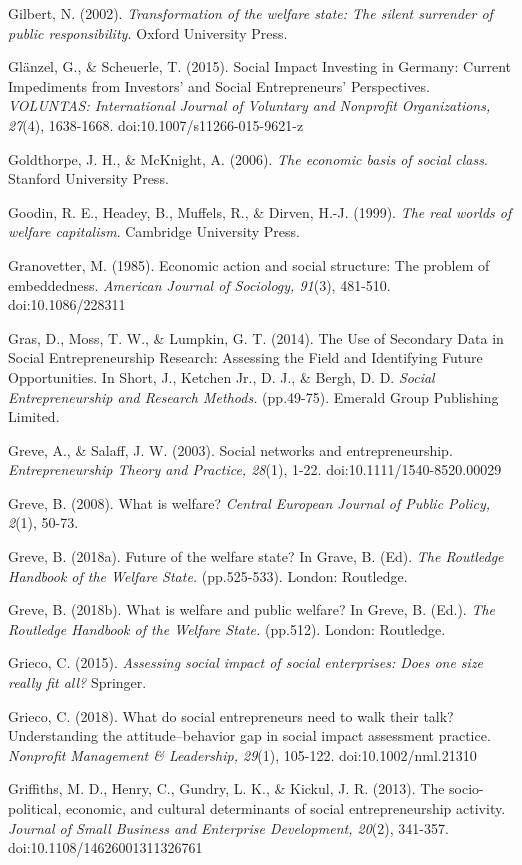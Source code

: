 \documentclass{article}
\begin{document}
Gilbert, N. (2002). \emph{Transformation of the welfare state: The silent surrender of public responsibility.} Oxford University Press.

Glänzel, G., \& Scheuerle, T. (2015). Social Impact Investing in Germany: Current Impediments from Investors' and Social Entrepreneurs' Perspectives. \emph{VOLUNTAS: International Journal of Voluntary and }\emph{Nonprofit}\emph{ Organizations, 27}(4), 1638-1668. doi:10.1007/s11266-015-9621-z

Goldthorpe, J. H., \& McKnight, A. (2006). \emph{The economic basis of social class}. Stanford University Press.

Goodin, R. E., Headey, B., Muffels, R., \& Dirven, H.-J. (1999). \emph{The real worlds of welfare capitalism}. Cambridge University Press.

Granovetter, M. (1985). Economic action and social structure: The problem of embeddedness. \emph{American Journal of Sociology, 91}(3), 481-510. doi:10.1086/228311

Gras, D., Moss, T. W., \& Lumpkin, G. T. (2014). The Use of Secondary Data in Social Entrepreneurship Research: Assessing the Field and Identifying Future Opportunities. In Short, J., Ketchen Jr., D. J., \& Bergh, D. D. \emph{Social Entrepreneurship and Research Methods.} (pp.49-75). Emerald Group Publishing Limited.

Greve, A., \& Salaff, J. W. (2003). Social networks and entrepreneurship. \emph{Entrepreneurship Theory and Practice, 28}(1), 1-22. doi:10.1111/1540-8520.00029

Greve, B. (2008). What is welfare? \emph{Central European Journal of Public Policy, 2}(1), 50-73. 

Greve, B. (2018a). Future of the welfare state? In Grave, B. (Ed). \emph{The Routledge Handbook of the Welfare State.} (pp.525-533). London: Routledge.

Greve, B. (2018b). What is welfare and public welfare? In Greve, B. (Ed.). \emph{The Routledge Handbook of the Welfare State.} (pp.512). London: Routledge.

Grieco, C. (2015). \emph{Assessing social impact of social enterprises: Does one size really fit all?} Springer.

Grieco, C. (2018). What do social entrepreneurs need to walk their talk? Understanding the attitude--behavior gap in social impact assessment practice. \emph{Nonprofit}\emph{ Management \& Leadership, 29}(1), 105-122. doi:10.1002/nml.21310

Griffiths, M. D., Henry, C., Gundry, L. K., \& Kickul, J. R. (2013). The socio-political, economic, and cultural determinants of social entrepreneurship activity. \emph{Journal of Small Business and Enterprise Development, 20}(2), 341-357. doi:10.1108/14626001311326761
\end{document}
